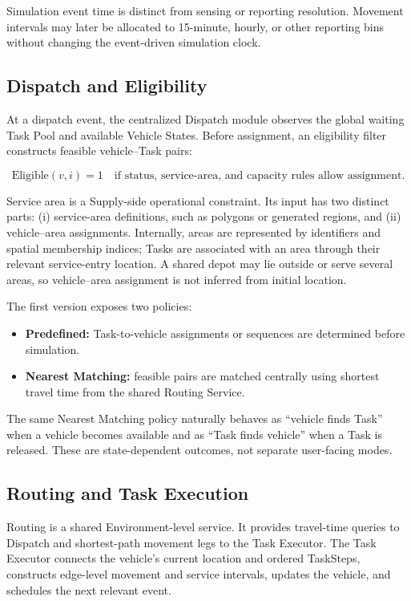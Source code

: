 \documentclass[11pt,a4paper]{article}
\begin{document}
Simulation event time is distinct from sensing or reporting resolution. Movement intervals may later be allocated to 15-minute, hourly, or other reporting bins without changing the event-driven simulation clock.

\subsection{Dispatch and Eligibility}

At a dispatch event, the centralized Dispatch module observes the global waiting Task Pool and available Vehicle States. Before assignment, an eligibility filter constructs feasible vehicle--Task pairs:

\[
\mathrm{Eligible}(v,i)=1
\quad\text{if status, service-area, and capacity rules allow assignment.}
\]

Service area is a Supply-side operational constraint. Its input has two distinct parts: (i) service-area definitions, such as polygons or generated regions, and (ii) vehicle--area assignments. Internally, areas are represented by identifiers and spatial membership indices; Tasks are associated with an area through their relevant service-entry location. A shared depot may lie outside or serve several areas, so vehicle--area assignment is not inferred from initial location.

The first version exposes two policies:

\begin{itemize}
  \item \textbf{Predefined:} Task-to-vehicle assignments or sequences are determined before simulation.
  \item \textbf{Nearest Matching:} feasible pairs are matched centrally using shortest travel time from the shared Routing Service.
\end{itemize}

The same Nearest Matching policy naturally behaves as ``vehicle finds Task'' when a vehicle becomes available and as ``Task finds vehicle'' when a Task is released. These are state-dependent outcomes, not separate user-facing modes.

\subsection{Routing and Task Execution}

Routing is a shared Environment-level service. It provides travel-time queries to Dispatch and shortest-path movement legs to the Task Executor. The Task Executor connects the vehicle's current location and ordered TaskSteps, constructs edge-level movement and service intervals, updates the vehicle, and schedules the next relevant event.
\end{document}
